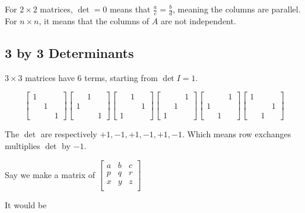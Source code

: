 For \(2 \times 2\) matrices, \(\det = 0\) means that \(\frac{a}{c} = \frac{b}{d}\), meaning the columns are parallel. For \(n \times n\), it means that the columns of \(A\) are not independent. 

\subsection{3 by 3 Determinants}

\(3 \times 3\) matrices have 6 terms, starting from \(\det I = 1\). 

\[
\begin{bmatrix}
1 &   &   \\
  & 1 &   \\
  &   & 1
\end{bmatrix}
%
\begin{bmatrix}
  & 1 &   \\
1 &   &   \\
  &   & 1
\end{bmatrix}
%
\begin{bmatrix}
  & 1 &   \\
  &   & 1 \\
1 &   &
\end{bmatrix}
%
\begin{bmatrix}
  &   & 1 \\
  & 1 &   \\
1 &   &
\end{bmatrix}
%
\begin{bmatrix}
  &   & 1 \\
1 &   &   \\
  & 1 &
\end{bmatrix}
%
\begin{bmatrix}
1 &   &   \\
  &   & 1 \\
  & 1 &
\end{bmatrix}
\]

The \(\det \)  are respectively \(+1, -1, +1, -1, +1, -1\). Which means row exchanges multiplies \(\det \) by \(-1\). 

Say we make a matrix of \(\begin{bmatrix}
    a & b & c  \\
    p & q & r  \\
    x & y & z  \\
\end{bmatrix}\) 

It would be 

